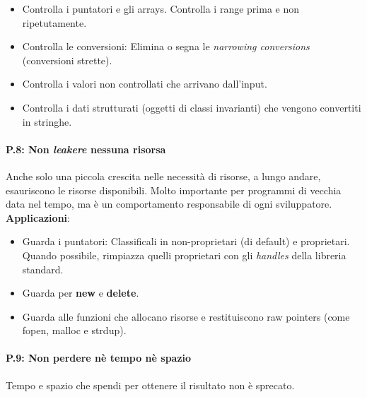 \begin{itemize}
	\item \textsf{\small Controlla i puntatori e gli arrays. Controlla i range prima e non ripetutamente.}
	\item \textsf{\small Controlla le conversioni: Elimina o segna le \emph{narrowing conversions} (conversioni strette).}
	\item \textsf{\small Controlla i valori non controllati che arrivano dall'input.}
	\item \textsf{\small Controlla i dati strutturati (oggetti di classi invarianti) che vengono convertiti in stringhe.}
\end{itemize}

\paragraph{P.8: Non \emph{leakere} nessuna risorsa}

\textsf{\small Anche solo una piccola crescita nelle necessità di risorse, a lungo andare, esauriscono le risorse disponibili. Molto importante per programmi di vecchia data nel tempo, ma è un comportamento responsabile di ogni sviluppatore.} \\

\textsf{\small \textbf{Applicazioni}: } 

\begin{itemize}
	\item \textsf{\small Guarda i puntatori: Classificali in non-proprietari (di default) e proprietari. Quando possibile, rimpiazza quelli proprietari con gli \emph{handles} della libreria standard.}
	\item \textsf{\small Guarda per \textbf{new} e \textbf{delete}.}
	\item \textsf{\small Guarda alle funzioni che allocano risorse e restituiscono raw pointers (come fopen, malloc e strdup).}
\end{itemize}

\paragraph{P.9: Non perdere nè tempo nè spazio}

\textsf{\small Tempo e spazio che spendi per ottenere il risultato non è sprecato.} \\

